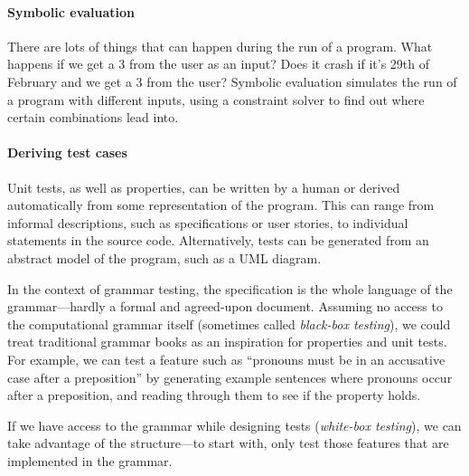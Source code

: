 \paragraph{Symbolic evaluation}

There are lots of things that can happen during the run of a
program. What happens if we get a 3 from the user as an input? Does it
crash if it's 29th of February and we get a 3 from the user?  Symbolic 
evaluation simulates the run of a program with different inputs, using 
a constraint solver to find out where certain combinations lead into.

\paragraph{Deriving test cases}

Unit tests, as well as properties, can be written by a human or derived
automatically from some representation of the program. This can range
from informal descriptions, such as specifications or user stories, to
individual statements in the source code. Alternatively, tests can be
generated from an abstract model of the program, such as a UML
diagram.

In the context of grammar testing, the specification is the whole
language of the grammar---hardly a formal and agreed-upon
document. Assuming no access to the computational grammar itself
(sometimes called \emph{black-box testing}), we could treat
traditional grammar books as an inspiration for properties and unit
tests. For example, we can test a feature such as ``pronouns must be
in an accusative case after a preposition'' by generating example
sentences where pronouns occur after a preposition, and reading
through them to see if the property holds.

If we have access to the grammar while designing tests
(\emph{white-box testing}), we can take advantage of the
structure---to start with, only test those features that are
implemented in the grammar. 




